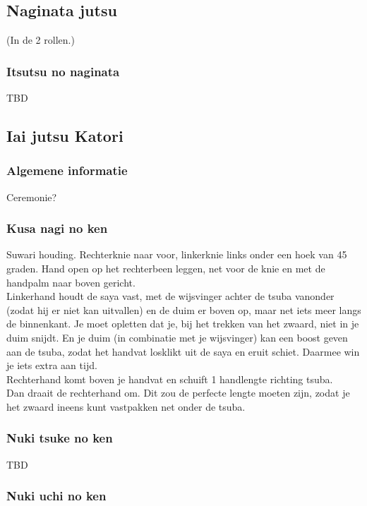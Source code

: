\subsection{Naginata jutsu}
(In de 2 rollen.)

\subsubsection{Itsutsu no naginata}

TBD

\subsection{Iai jutsu Katori}

\subsubsection{Algemene informatie}

Ceremonie?

\subsubsection{Kusa nagi no ken}

Suwari houding. Rechterknie naar voor, linkerknie links onder een hoek van 45 graden. Hand open op het rechterbeen leggen, net voor de knie en met de handpalm naar boven gericht.\\
Linkerhand houdt de saya vast, met de wijsvinger achter de tsuba vanonder (zodat hij er niet kan uitvallen) en de duim er boven op, maar net iets meer langs de binnenkant. Je moet opletten dat je, bij het trekken van het zwaard, niet in je duim snijdt. En je duim (in combinatie met je wijsvinger) kan een boost geven aan de tsuba, zodat het handvat losklikt uit de saya en eruit schiet. Daarmee win je iets extra aan tijd.\\
Rechterhand komt boven je handvat en schuift 1 handlengte richting tsuba.\\
Dan draait de rechterhand om. Dit zou de perfecte lengte moeten zijn, zodat je het zwaard ineens kunt vastpakken net onder de tsuba.

\subsubsection{Nuki tsuke no ken}

TBD

\subsubsection{Nuki uchi no ken}


